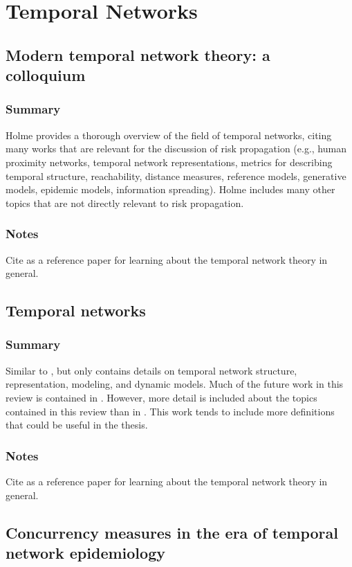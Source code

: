 \section{Temporal Networks}

\subsection{Modern temporal network theory: a colloquium}
\subsubsection*{Summary}
Holme provides a thorough overview of the field of temporal networks, citing many works that are relevant for the discussion of risk propagation (e.g., human proximity networks, temporal network representations, metrics for describing temporal structure, reachability, distance measures, reference models, generative models, epidemic models, information spreading). Holme includes many other topics that are not directly relevant to risk propagation.
\subsubsection*{Notes}
Cite as a reference paper for learning about the temporal network theory in general.

\subsection{Temporal networks}
\subsubsection*{Summary}
Similar to \cite{Holme2015b}, but only contains details on temporal network structure, representation, modeling, and dynamic models. Much of the future work in this review is contained in \cite{Holme2015b}. However, more detail is included about the topics contained in this review than in \cite{Holme2015b}. This work tends to include more definitions that could be useful in the thesis.
\subsubsection*{Notes}
Cite as a reference paper for learning about the temporal network theory in general.

\subsection{Concurrency measures in the era of temporal network epidemiology}

